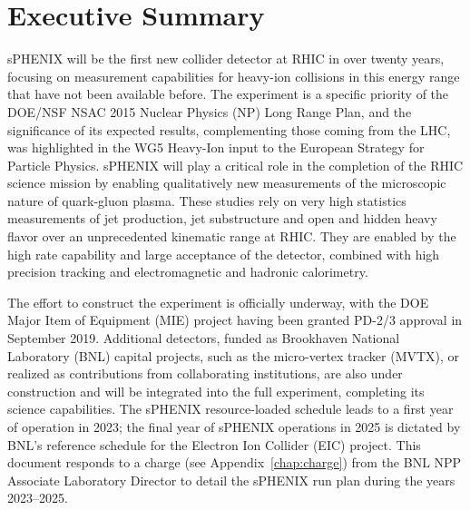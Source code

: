 \chapter*{Executive Summary}
\label{executive_summary}
\setcounter{page}{1}

sPHENIX will be the first new collider detector at RHIC in over twenty
years, focusing on measurement capabilities for heavy-ion collisions in
this energy range that have not been available before.  The experiment
is a specific priority of the DOE/NSF NSAC 2015 Nuclear Physics (NP) 
Long Range Plan, and the
significance of its expected results, complementing those coming from
the LHC, was highlighted in the WG5 Heavy-Ion input to the European
Strategy for Particle Physics.  sPHENIX will play a critical role in
the completion of the RHIC science mission by enabling qualitatively
new measurements of the microscopic nature of quark-gluon plasma.
These studies rely on very high statistics measurements of jet
production, jet substructure and open and hidden heavy flavor over an
unprecedented kinematic range at RHIC.  They are enabled by the high
rate capability and large acceptance of the detector, combined with
high precision tracking and electromagnetic and hadronic calorimetry.

The effort to construct the experiment is officially underway, with
the DOE Major Item of Equipment (MIE) project having been granted PD-2/3 approval in September
2019.  Additional detectors, funded as Brookhaven National Laboratory (BNL)
capital projects, such as
the micro-vertex tracker (MVTX), or realized as contributions from
collaborating institutions, are also under construction and will be
integrated into the full experiment, completing its science
capabilities.  The sPHENIX resource-loaded schedule leads to a first
year of operation in 2023; the final year of sPHENIX operations in
2025 is dictated by BNL's reference schedule for the Electron Ion Collider (EIC) project.
This document responds to a charge (see Appendix~\ref{chap:charge})
from the BNL NPP Associate Laboratory Director to detail the sPHENIX run plan during the years 2023--2025.

